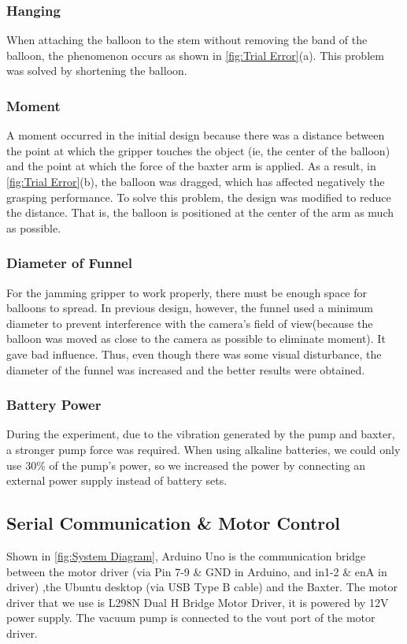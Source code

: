 \documentclass[conference,a4paper]{IEEEtran}
\begin{document}
\subsubsection{Hanging}
When attaching the balloon to the stem without removing the band of the balloon, the phenomenon occurs as shown in \autoref{fig:Trial Error}(a). This problem was solved by shortening the balloon. 
\subsubsection{Moment}
A moment occurred in the initial design because there was a distance between the point at which the gripper touches the object (ie, the center of the balloon) and the point at which the force of the baxter arm is applied. As a result, in \autoref{fig:Trial Error}(b), the balloon was dragged, which has affected negatively the grasping performance. To solve this problem, the design was modified to reduce the distance. That is, the balloon is positioned at the center of the arm as much as possible.
\subsubsection{Diameter of Funnel}
For the jamming gripper to work properly, there must be enough space for balloons to spread. In previous design, however, the funnel used a minimum diameter to prevent interference with the camera's field of view(because the balloon was moved as close to the camera as possible to eliminate moment). It gave bad influence. Thus, even though there was some visual disturbance, the diameter of the funnel was increased and the better results were obtained.
\subsubsection{Battery Power}
During the experiment, due to the vibration generated by the pump and baxter, a stronger pump force was required. When using alkaline batteries, we could only use 30\% of the pump's power, so we increased the power by connecting an external power supply instead of battery sets.



\subsection{Serial Communication \& Motor Control}

Shown in \autoref{fig:System Diagram}, Arduino Uno is the communication bridge between the motor driver (via Pin 7-9 \& GND in Arduino, and in1-2 \& enA in driver) ,the Ubuntu desktop (via USB Type B cable) and the Baxter. The motor driver that we use is L298N Dual H Bridge Motor Driver, it is powered by 12V power supply. The vacuum pump is connected to the vout port of the motor driver. 
\end{document}
